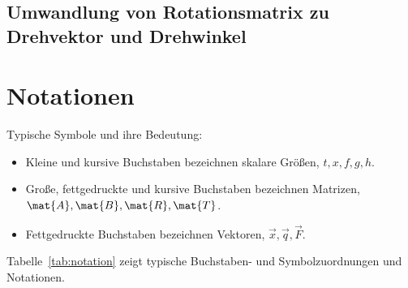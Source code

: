 	\section{Umwandlung von Rotationsmatrix zu Drehvektor und Drehwinkel} %

\chapter{Notationen}
	Typische Symbole und ihre Bedeutung:
	\begin{itemize}
		\item Kleine und kursive Buchstaben bezeichnen skalare Größen, \zB \( t, x, f, g, h \).
		\item Große, fettgedruckte und kursive Buchstaben bezeichnen Matrizen, \zB \( \mat{A}, \mat{B}, \mat{R}, \mat{T} \).
		\item Fettgedruckte Buchstaben bezeichnen Vektoren, \zB \( \vec{x}, \vec{q}, \vec{F} \).
	\end{itemize}
	Tabelle~\ref{tab:notation} zeigt typische Buchstaben- und Symbolzuordnungen und Notationen.

